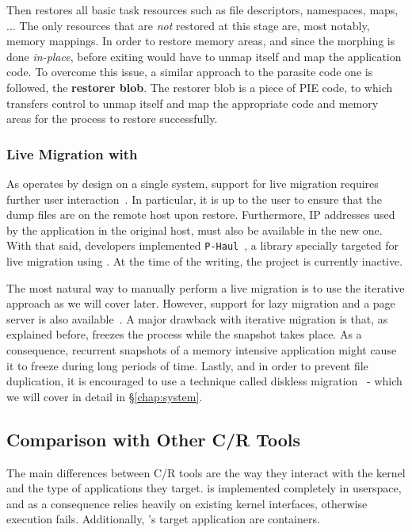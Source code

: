 Then \criu restores all basic task resources such as file descriptors, namespaces, maps, ...
The only resources that are \emph{not} restored at this stage are, most notably, memory mappings.
In order to restore memory areas, and since the morphing is done \textit{in-place}, before exiting \criu would have to unmap itself and map the application code.
To overcome this issue, a similar approach to the parasite code one is followed, the \textbf{restorer blob}.
The restorer blob is a piece of PIE code, to which \criu transfers control to unmap itself and map the appropriate code and memory areas for the process to restore successfully.

\subsubsection*{Live Migration with \criu}

As \criu operates by design on a single system, support for live migration requires further user interaction~\cite{criu-live-migration}.
In particular, it is up to the user to ensure that the dump files are on the remote host upon restore.
Furthermore, IP addresses used by the application in the original host, must also be available in the new one.
With that said, \criu developers implemented \texttt{P-Haul}~\cite{criu-phaul}, a library specially targeted for live migration using \criu.
At the time of the writing, the project is currently inactive.

The most natural way to manually perform a live migration is to use the iterative approach as we will cover later.
However, support for lazy migration and a page server is also available~\cite{criu-lazy-migration}.
A major drawback with iterative migration is that, as explained before, \criu freezes the process while the snapshot takes place.
As a consequence, recurrent snapshots of a memory intensive application might cause it to freeze during long periods of time.
Lastly, and in order to prevent file duplication, it is encouraged to use a technique called diskless migration~\cite{criu-diskless} - which we will cover in detail in \S\ref{chap:system}.

\subsection{Comparison with Other C/R Tools}

The main differences between C/R tools are the way they interact with the kernel and the type of applications they target.
\criu is implemented completely in userspace, and as a consequence relies heavily on existing kernel interfaces, otherwise execution fails.
Additionally, \criu's target application are containers.

